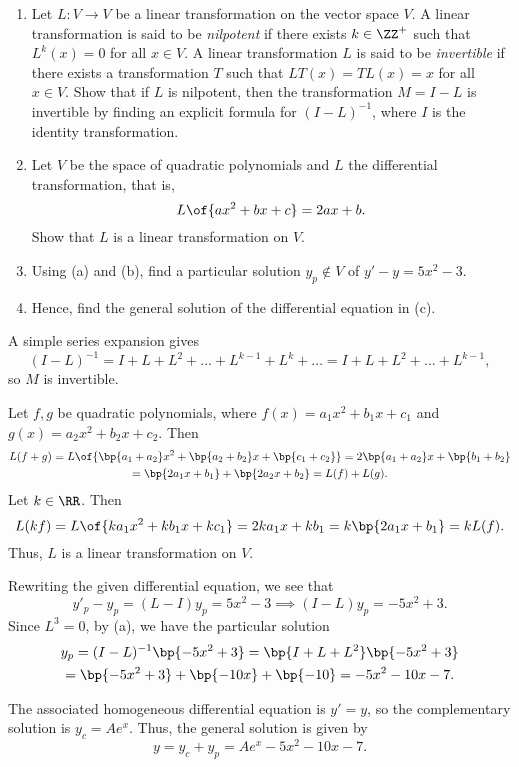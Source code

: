 \clearpage
\begin{problem}
    \begin{enumerate}
        \item Let $L : V \to V$ be a linear transformation on the vector space $V$. A linear transformation is said to be \emph{nilpotent} if there exists $k \in \ZZ^+$ such that $L^k(x) = 0$ for all $x \in V$. A linear transformation $L$ is said to be \emph{invertible} if there exists a transformation $T$ such that $LT(x) = TL(x) = x$ for all $x \in V$. Show that if $L$ is nilpotent, then the transformation $M = I - L$ is invertible by finding an explicit formula for $(I - L)^{-1}$, where $I$ is the identity transformation.
        \item Let $V$ be the space of quadratic polynomials and $L$ the differential transformation, that is, \[L\of{ax^2 + bx + c} = 2ax + b.\] Show that $L$ is a linear transformation on $V$.
        \item Using (a) and (b), find a particular solution $y_p \notin V$ of $y' - y = 5x^2 - 3$.
        \item Hence, find the general solution of the differential equation in (c).
    \end{enumerate}
\end{problem}
\begin{solution}
    \begin{ppart}
        A simple series expansion gives \[(I - L)^{-1} = I + L + L^2 + \dots + L^{k-1} + L^k + \dots = I + L + L^2 + \dots + L^{k-1},\] so $M$ is invertible.
    \end{ppart}
    \begin{ppart}
        Let $f, g$ be quadratic polynomials, where $f(x) = a_1 x^2 + b_1x + c_1$ and $g(x) = a_2 x^2 + b_2 x + c_2$. Then
        \begin{gather*}
            L(f + g) = L\of{\bp{a_1 + a_2} x^2 + \bp{a_2 + b_2} x + \bp{c_1 + c_2}} = 2\bp{a_1 + a_2}x + \bp{b_1 + b_2}\\
            = \bp{2a_1x + b_1} + \bp{2a_2x + b_2} = L(f) + L(g).
        \end{gather*}
        Let $k \in \RR$. Then \[L(kf) = L\of{ka_1 x^2 + kb_1 x + kc_1} = 2ka_1 x + kb_1 = k\bp{2a_1 x + b_1} = k L(f).\] Thus, $L$ is a linear transformation on $V$.
    \end{ppart}
    \begin{ppart}
        Rewriting the given differential equation, we see that \[y'_p - y_p = (L-I) y_p = 5x^2 - 3 \implies (I-L) y_p = -5x^2 + 3.\] Since $L^3 = 0$, by (a), we have the particular solution
        \begin{gather*}
            y_p = (I-L)^{-1} \bp{-5x^2 + 3} = \bp{I + L + L^2} \bp{-5x^2 + 3}\\
            = \bp{-5x^2 + 3} + \bp{-10x} + \bp{-10} = -5x^2 -10x - 7.
        \end{gather*}
    \end{ppart}
    \begin{ppart}
        The associated homogeneous differential equation is $y' = y$, so the complementary solution is $y_c = Ae^x$. Thus, the general solution is given by \[y = y_c + y_p = Ae^x - 5x^2 - 10 x - 7.\] 
    \end{ppart}
\end{solution}